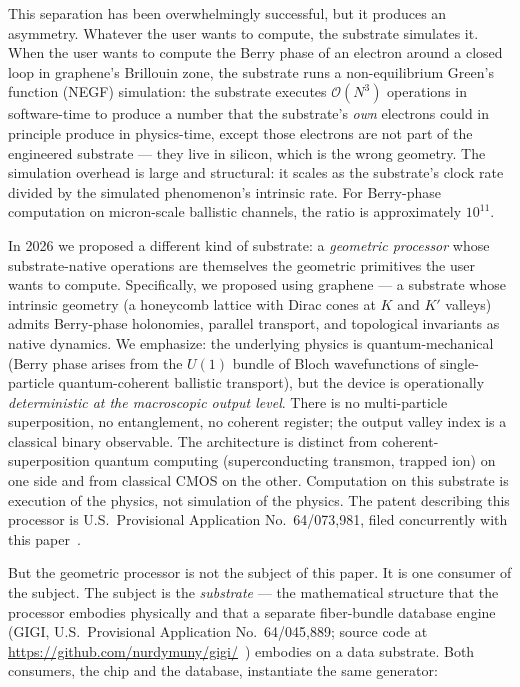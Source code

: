 \documentclass[11pt,letterpaper]{article}
\begin{document}
This separation has been overwhelmingly successful, but it produces an
asymmetry. Whatever the user wants to compute, the substrate
simulates it. When the user wants to compute the Berry phase of an
electron around a closed loop in graphene's Brillouin zone, the
substrate runs a non-equilibrium Green's function (NEGF) simulation:
the substrate executes $\mathcal{O}(N^3)$ operations in
software-time to produce a number that the substrate's \emph{own}
electrons could in principle produce in physics-time, except those
electrons are not part of the engineered substrate --- they live in
silicon, which is the wrong geometry. The simulation overhead is
large and structural: it scales as the substrate's clock rate divided
by the simulated phenomenon's intrinsic rate. For Berry-phase
computation on micron-scale ballistic channels, the ratio is
approximately $10^{11}$.

In 2026 we proposed a different kind of substrate: a \emph{geometric
processor} whose substrate-native operations are themselves the
geometric primitives the user wants to compute. Specifically, we
proposed using graphene --- a substrate whose intrinsic geometry (a
honeycomb lattice with Dirac cones at $K$ and $K'$ valleys) admits
Berry-phase holonomies, parallel transport, and topological
invariants as native dynamics. We emphasize: the underlying physics
is quantum-mechanical (Berry phase arises from the $U(1)$ bundle of
Bloch wavefunctions of single-particle quantum-coherent ballistic
transport), but the device is operationally \emph{deterministic at
the macroscopic output level}. There is no multi-particle
superposition, no entanglement, no coherent register; the output
valley index is a classical binary observable. The architecture is
distinct from coherent-superposition quantum computing
(superconducting transmon, trapped ion) on one side and from
classical CMOS on the other. Computation on this substrate is
execution of the physics, not simulation of the physics. The patent
describing this processor is U.S.\ Provisional Application
No.\ 64/073,981, filed concurrently with this paper~\cite{davis2026dpu}.

But the geometric processor is not the subject of this paper. It is
one consumer of the subject. The subject is the \emph{substrate} ---
the mathematical structure that the processor embodies physically and
that a separate fiber-bundle database engine (GIGI, U.S.\ Provisional
Application No.\ 64/045,889; source code at
\url{https://github.com/nurdymuny/gigi/}~\cite{gigi2026code}) embodies on
a data substrate. Both
consumers, the chip and the database, instantiate the same generator:
\end{document}
